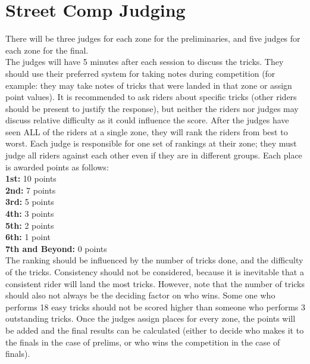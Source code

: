 \section{Street Comp Judging}
There will be three judges for each zone for the preliminaries, and five judges for each zone for the final. \\
The judges will have 5 minutes after each session to discuss the tricks. They should use their preferred system for taking notes during competition (for example: they may take notes of tricks that were landed in that zone or assign point values). It is recommended to ask riders about specific tricks (other riders should be present to justify the response), but neither the riders nor judges may discuss relative difficulty as it could influence the score. After the judges have seen ALL of the riders at a single zone, they will rank the riders from best to worst. Each judge is responsible for one set of rankings at their zone; they must judge all riders against each other even if they are in different groups. Each place is awarded points as follows:\\
\textbf{1st:} 10 points\\
\textbf{2nd:} 7 points\\
\textbf{3rd:} 5 points\\
\textbf{4th:} 3 points\\
\textbf{5th:} 2 points\\
\textbf{6th:} 1 point\\
\textbf{7th and Beyond:} 0 points\\
The ranking should be influenced by the number of tricks done, and the difficulty of the tricks. Consistency should not be considered, because it is inevitable that a consistent rider will land the most tricks. However, note that the number of tricks
should also not always be the deciding factor on who wins. Some one who performs 18 easy tricks should not be scored higher than someone who performs 3 outstanding tricks. Once the judges assign places for every zone, the points will be added and the final results can be calculated (either to decide who makes it to the finals in the case of prelims, or who wins the competition in the case of finals).








